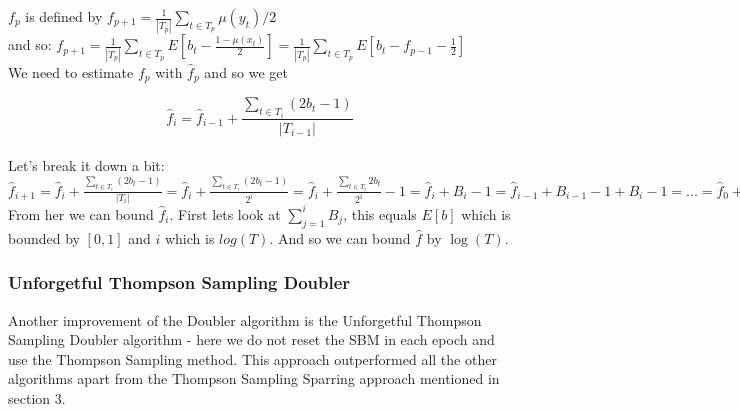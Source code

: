 \documentclass{llncs}
\begin{document}
		$f_p$ is defined by $f_{p+1} = 
		\frac{1}{|T_p|}\sum\limits_{t\in T_p} \mu(y_t)/2$\\
		and so: $f_{p+1} = 
		\frac{1}{|T_p|}\sum\limits_{t\in T_p} E[b_t - \frac{1-\mu(x_t)}{2}] = \frac{1}{|T_p|}\sum\limits_{t\in T_p} E[b_t - f_{p-1}-\frac{1}{2}]$ \\
		We need to estimate $f_p$ with $\hat{f}_p$ and so we get

        $$\hat{f}_i=\hat{f}_{i-1} + \frac{\sum\limits_{t\in T_i} (2b_t -1)}{|T_{i-1}|}$$
		\\		
		Let's break it down a bit:\\
		$\hat{f}_{i+1}=\hat{f}_{i} + 
		\frac{\sum\limits_{t\in T_i} (2b_t -1)}{|T_{i}|} = 
		\hat{f}_{i} + 
		\frac{\sum\limits_{t\in T_i} (2b_t -1)}{2^{i}} = 
		\hat{f}_{i} + 
		\frac{\sum\limits_{t\in T_i} 2b_t}{2^{i}}-1 = 
		\hat{f}_{i} + B_i -1 =  
		\hat{f}_{i-1} +B_{i-1} -1+ B_i -1 = ... =  
		\hat{f}_{0} + \sum\limits_{j=1}^i B_{j}+i$
		\\
		From her we can bound $\hat{f}_{i}$.
		First lets look at $\sum\limits_{j=1}^i B_{j}$, this equals $E[b]$ which is bounded by $[0,1]$ and $i$ which is $log(T)$. And so we can bound $\hat{f}$ by $\log(T)$.

				
	\subsubsection{Unforgetful Thompson Sampling Doubler}
		Another improvement of the Doubler algorithm is the Unforgetful Thompson Sampling Doubler algorithm - here we do not reset the SBM in each epoch and use the Thompson Sampling method. This approach outperformed all the other algorithms apart from the Thompson Sampling Sparring approach mentioned in section 3.

		
		
		\newpage	
\end{document}
